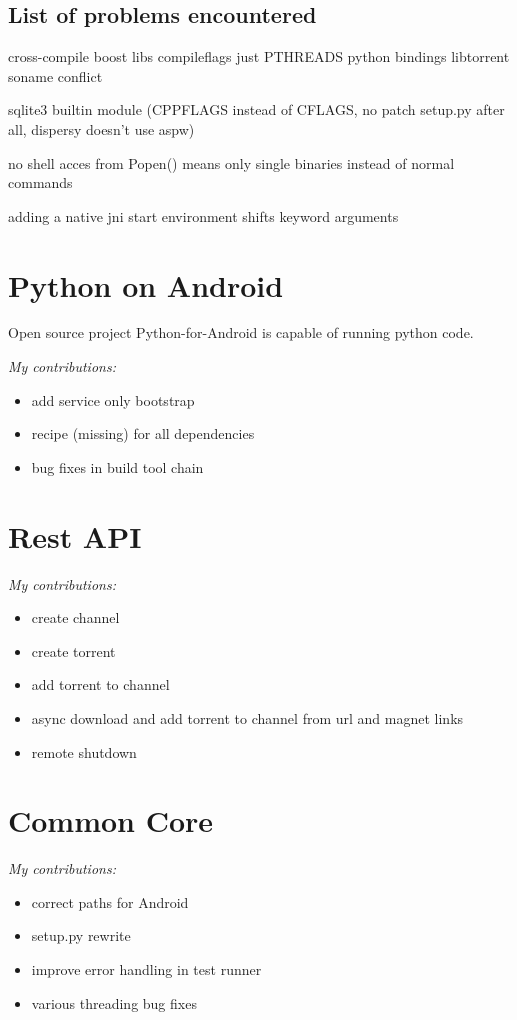 \documentclass[]{report}
\begin{document}
\subsection*{List of problems encountered}
cross-compile boost libs compileflags just PTHREADS
python bindings libtorrent soname conflict


sqlite3 builtin module (CPPFLAGS instead of CFLAGS, no patch setup.py after all, dispersy doesn't use aspw)


no shell acces from Popen() means only single binaries instead of normal commands

adding a native jni start environment shifts keyword arguments



\section{Python on Android}
Open source project Python-for-Android is capable of running python code.

\emph{My contributions:}
\begin{itemize}
	\item add service only bootstrap
	\item recipe (missing) for all dependencies
	\item bug fixes in build tool chain
\end{itemize}


\section{Rest API}

\emph{My contributions:}
\begin{itemize}
	\item create channel
	\item create torrent
	\item add torrent to channel
	\item async download and add torrent to channel from url and magnet links
	\item remote shutdown
\end{itemize}

\section{Common Core}

\emph{My contributions:}
\begin{itemize}
	\item correct paths for Android
	\item setup.py rewrite
	\item improve error handling in test runner
	\item various threading bug fixes
\end{itemize}
\end{document}
